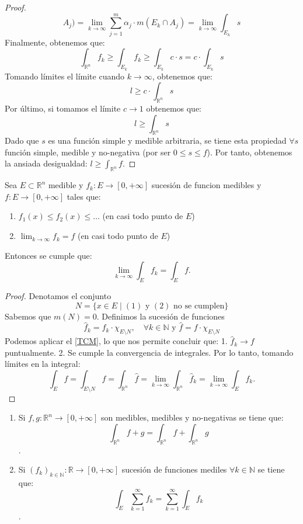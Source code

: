 \begin{proof}
$$        A_j) = \lim\limits_{k \to \infty} \sum_{j=1}^{m} \alpha_j \cdot m(E_k \cap A_j)
        = \lim\limits_{k \to \infty} \int_{E_k} s$$ Finalmente, obtenemos que: $$
        \int_{\mathbb{R}^n}f_k \geq \int_{E_k} f_k \geq \int_{E_k} c \cdot s = c \cdot
        \int_{E_k} s$$ Tomando límites el límite cuando $k \to \infty$, obtenemos que:
    $$ l \geq c \cdot \int_{\mathbb{R}^n} s$$ Por último, si tomamos el límite $c
        \to 1$ obtenemos que: $$ l \geq \int_{\mathbb{R}^n} s$$ Dado que $s$ es una
    función simple y medible arbitraria, se tiene esta propiedad $\forall s$
    función simple, medible y no-negativa (por ser $0 \leq s \leq f$). Por tanto,
    obtenemos la ansiada desigualdad: $l \geq \int_{\mathbb{R}^n} f$.
\end{proof}
\begin{teorema} 
    Sea $E \subset \mathbb{R}^n$ medible y $f_k: E \to [0, +\infty]$ sucesión de funcion medibles y $f: E \to [0, +\infty]$ tales que:
    \begin{enumerate}
        \item $f_1(x) \leq f_2(x) \leq \dots$ (en casi todo punto de $E$)
        \item $\lim_{k \to \infty}f_k = f$ (en casi todo punto de $E$)
    \end{enumerate}
    Entonces se cumple que: $$\lim_{k \to \infty}\int_{E}f_k = \int_{E}f.$$
\end{teorema}
\begin{proof}
    Denotamos el conjunto $$ N = \{ x \in E \mid (1) \text{ y } (2) \text{ no se cumplen} \} $$
    Sabemos que \( m(N) = 0 \). Definimos la sucesión de funciones $$ \hat{f}_k = f_k \cdot \chi_{E \setminus  N}, \quad \forall k \in \mathbb{N} \text{ y } \hat{f} = f \cdot \chi_{E\setminus N}$$
    Podemos aplicar el \cref{TCM}, lo que nos permite concluir que:
    1. \( \hat{f}_k \to f \) puntualmente.
    2. Se cumple la convergencia de integrales.
    Por lo tanto, tomando límites en la integral:
    $$ \int_E f = \int_{E \setminus N} f = \int_{\mathbb{R}^n}\hat{f} = \lim_{k \to \infty} \int_{\mathbb{R}^n} \hat{f}_k = \lim_{k \to \infty} \int_E f_k. $$
\end{proof}
\begin{corolario}
    \vspace{-2.5em}
    \begin{enumerate}
        \item Si $f, g: \mathbb{R}^n \to [0, +\infty]$ son medibles, medibles y no-negativas
              se tiene que: $$\int_{\mathbb{R}^n}f+g = \int_{\mathbb{R}^n}f +
                  \int_{\mathbb{R}^n}g$$.
        \item Si $(f_k)_{k\in \mathbb{N}}: \mathbb{R} \to [0, +\infty]$ sucesión de funciones
              mediles $\forall k \in \mathbb{N}$ se tiene que:
              $$\int_{E}\sum_{k=1}^{\infty}f_k = \sum_{k=1}^{\infty}\int_{E}f_k$$.
    \end{enumerate}
\end{corolario}
